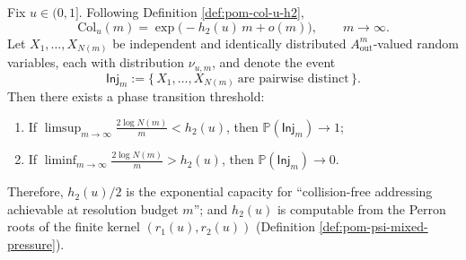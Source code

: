 \begin{theorem}\label{thm:pom-collision-threshold-capacity}
Fix \(u\in(0,1]\).
Following Definition \ref{def:pom-col-u-h2},
\[
\mathrm{Col}_u(m)=\exp\!\bigl(-h_2(u)\,m+o(m)\bigr),\qquad m\to\infty.
\]
Let \(X_1,\dots,X_{N(m)}\) be independent and identically distributed \(A_{\mathrm{out}}^m\)-valued random variables, each with distribution \(\nu_{u,m}\), and denote the event
\[
\mathsf{Inj}_m:=\{\,X_1,\dots,X_{N(m)}\ \text{are pairwise distinct}\,\}.
\]
Then there exists a phase transition threshold:
\begin{enumerate}
  \item If \(\displaystyle \limsup_{m\to\infty}\frac{2\log N(m)}{m}<h_2(u)\), then \(\mathbb{P}(\mathsf{Inj}_m)\to 1\);
  \item If \(\displaystyle \liminf_{m\to\infty}\frac{2\log N(m)}{m}>h_2(u)\), then \(\mathbb{P}(\mathsf{Inj}_m)\to 0\).
\end{enumerate}
Therefore, \(h_2(u)/2\) is the exponential capacity for ``collision-free addressing achievable at resolution budget \(m\)''; and \(h_2(u)\) is computable from the Perron roots of the finite kernel \((r_1(u),r_2(u))\) (Definition \ref{def:pom-psi-mixed-pressure}).
\end{theorem}

